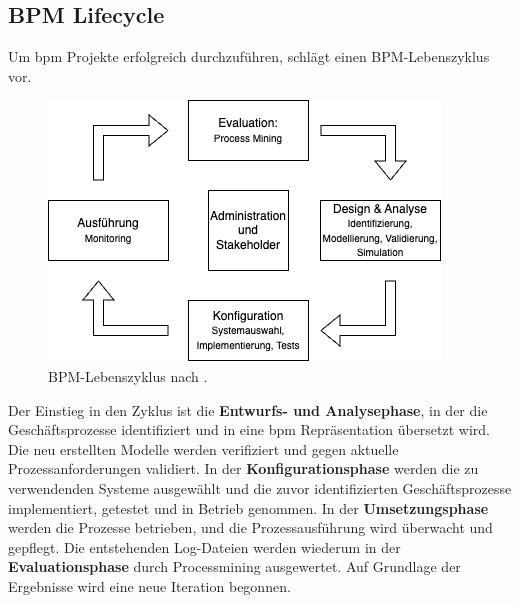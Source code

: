     \subsection{BPM Lifecycle}
        Um \gls{bpm} Projekte erfolgreich durchzuführen, schlägt \citet{Weske2019} einen BPM-Lebenszyklus vor. 

        \begin{figure}[H]
            \includegraphics[width=\textwidth]{../assets/images/BPM-Lebenszyklus.drawio.png}
            \caption{BPM-Lebenszyklus nach \citet{Weske2019}.}
            \end{figure}
    
        Der Einstieg in den Zyklus ist die \textbf{Entwurfs- und Analysephase}, in der die Geschäftsprozesse identiﬁziert und in eine \gls{bpm} Repräsentation übersetzt wird. Die neu erstellten Modelle werden veriﬁziert und gegen aktuelle Prozessanforderungen validiert. In der \textbf{Konﬁgurationsphase} werden die zu verwendenden Systeme ausgewählt und die zuvor identifizierten Geschäftsprozesse implementiert, getestet und in Betrieb genommen. In der \textbf{Umsetzungsphase} werden die Prozesse betrieben, und die Prozessausführung wird überwacht und gepflegt. Die entstehenden Log-Dateien werden wiederum in der \textbf{Evaluationsphase} durch Processmining ausgewertet. Auf Grundlage der Ergebnisse wird eine neue Iteration begonnen.
    
